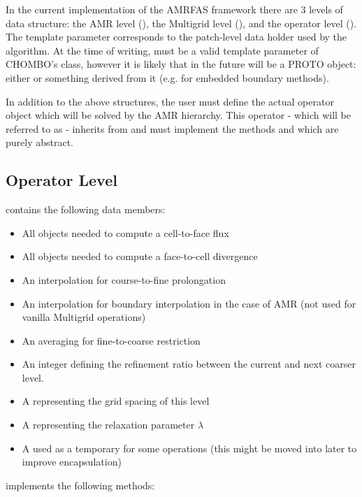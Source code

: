 \documentclass[12pt,a4paper]{article}
\begin{document}
In the current implementation of the AMRFAS framework there are 3 levels of data structure: the AMR level (), the Multigrid level (), and the operator level (). The template parameter  corresponds to the patch-level data holder used by the algorithm. At the time of writing,  must be a valid template parameter of CHOMBO's  class, however it is likely that in the future  will be a PROTO object: either  or something derived from it (e.g. for embedded boundary methods). 

In addition to the above structures, the user must define the actual operator object which will be solved by the AMR hierarchy. This operator - which will be referred to as  - inherits from  and must implement the methods  and  which are purely abstract. 

\subsection{Operator Level}
 contains the following data members:
\begin{itemize}
\item All  objects needed to compute a cell-to-face flux
\item All  objects needed to compute a face-to-cell divergence
\item An interpolation  for course-to-fine prolongation
\item An interpolation  for boundary interpolation in the case of AMR (not used for vanilla Multigrid operations)
\item An averaging  for fine-to-coarse restriction
\item An integer defining the refinement ratio between the current and next coarser level. 
\item A  representing the grid spacing of this level
\item A  representing the relaxation parameter $\lambda$
\item A  used as a temporary for some operations (this might be moved into  later to improve encapsulation)
\end{itemize}

 implements the following methods:
\end{document}
